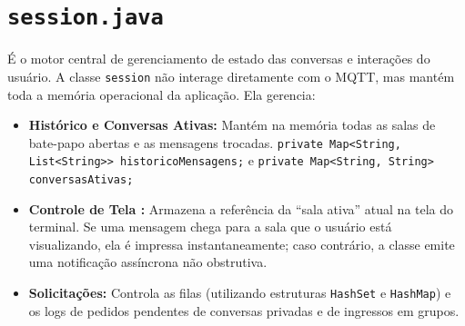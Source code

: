 \documentclass{report}
\begin{document}
\section{\texttt{session.java}}
É o motor central de gerenciamento de estado das conversas e interações do usuário. A classe \texttt{session} não interage diretamente com o MQTT, mas mantém toda a memória operacional da aplicação. Ela gerencia:
\begin{itemize}
	\item \textbf{Histórico e Conversas Ativas:} Mantém na memória todas as salas de bate-papo abertas e as mensagens trocadas. \texttt{private Map<String, List<String>> historicoMensagens;} e \texttt{private Map<String, String> conversasAtivas;}
    \item \textbf{Controle de Tela :} Armazena a referência da ``sala ativa'' atual na tela do terminal. Se uma mensagem chega para a sala que o usuário está visualizando, ela é impressa instantaneamente; caso contrário, a classe emite uma notificação assíncrona não obstrutiva.
    \item \textbf{Solicitações:} Controla as filas (utilizando estruturas \texttt{HashSet} e \texttt{HashMap}) e os logs de pedidos pendentes de conversas privadas e de ingressos em grupos.
\end{itemize}
\end{document}
